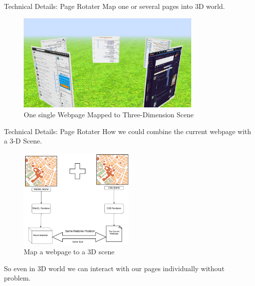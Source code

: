 \documentclass{beamer}
\begin{document}
\begin{frame}{Technical Details: Page Rotater}
Map one or several pages into 3D world.
\begin{center}
    \begin{figure}
        \includegraphics[width=0.8\textwidth]{./images/multi-3d-webpages.png}
        \caption{One single Webpage Mapped to Three-Dimension Scene}
    \end{figure}
\end{center}
\begin{center}
\end{center}
\end{frame}

\begin{frame}{Technical Details: Page Rotater}
How we could combine the current webpage with a 3-D Scene.
\begin{center}
    \begin{figure}
        \includegraphics[width=0.5\textwidth]{./images/css3d.png}
        \caption{Map a webpage to a 3D scene}
    \end{figure}
\end{center}
So even in 3D world we can interact with our pages individually without problem.
\end{frame}
\end{document}
